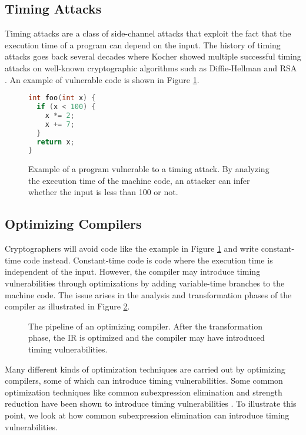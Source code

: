 \subsection{Timing Attacks}
Timing attacks are a class of side-channel attacks that exploit the fact that the execution time of a program can depend on the input.
The history of timing attacks goes back several decades where Kocher showed multiple successful timing attacks on well-known cryptographic algorithms such as Diffie-Hellman and RSA \citep{1996-timing-attacks}.
An example of vulnerable code is shown in Figure \ref{fig:timing-attack-example}.
\begin{figure}[H]
  \begin{lstlisting}[style=defstyle,language=C, xleftmargin=6.8cm, xrightmargin=6.8cm]
int foo(int x) {
  if (x < 100) {
    x *= 2;
    x += 7;
  }
  return x;
} \end{lstlisting} 
  \caption{Example of a program vulnerable to a timing attack. By analyzing the execution time of the machine code, an attacker can infer whether the input is less than 100 or not.}
  \label{fig:timing-attack-example}
\end{figure}

\subsection{Optimizing Compilers}
Cryptographers will avoid code like the example in Figure \ref{fig:timing-attack-example} and write constant-time code instead.
Constant-time code is code where the execution time is independent of the input.
However, the compiler may introduce timing vulnerabilities through optimizations by adding variable-time branches to the machine code.
The issue arises in the analysis and transformation phases of the compiler as illustrated in Figure \ref{fig:optimizing-compiler-pipeline}.

\begin{figure}[H]
  \centering
  
  \caption{The pipeline of an optimizing compiler. After the transformation phase, the IR is optimized and the compiler may have introduced timing vulnerabilities.}
  \label{fig:optimizing-compiler-pipeline}
\end{figure}

Many different kinds of optimization techniques are carried out by optimizing compilers, some of which can introduce timing vulnerabilities.
Some common optimization techniques like common subexpression elimination and strength reduction have been shown to introduce timing vulnerabilities \citep{optimizations-linked-to-timing-attacks}.
To illustrate this point, we look at how common subexpression elimination can introduce timing vulnerabilities.

